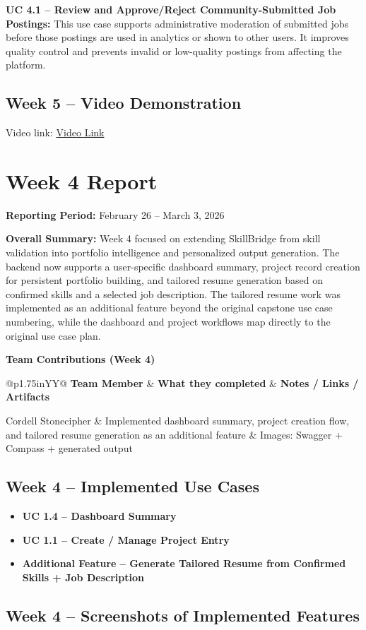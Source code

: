 \documentclass[11pt]{article}
\makeatletter
\newcommand{\WeekReport}[4]{
  \clearpage
  \section*{Week #1 Report}
  \addcontentsline{toc}{section}{Week #1 Report}
  \vspace{-0.25em}
  \noindent\textbf{Reporting Period:} #2

  \vspace{0.5em}
  \noindent\textbf{Overall Summary:} #3

  \vspace{0.75em}
  \noindent\textbf{Team Contributions (Week #1)}
  \vspace{0.25em}

  \begin{table}[H]
    \renewcommand{\arraystretch}{1.2}
    \begin{tabularx}{\linewidth}{@{}p{1.75in}YY@{}}
      \toprule
      \textbf{Team Member} & \textbf{What they completed} & \textbf{Notes / Links / Artifacts} \\
      \midrule
      #4
      \bottomrule
    \end{tabularx}
  \end{table}
}
\makeatother
\begin{document}
\noindent
\textbf{UC 4.1 -- Review and Approve/Reject Community-Submitted Job Postings:}
This use case supports administrative moderation of submitted jobs before those postings are used in analytics or shown to other users. It improves quality control and prevents invalid or low-quality postings from affecting the platform.

\subsection*{Week 5 -- Video Demonstration}
\noindent
Video link: \href{PASTE_PR5_VIDEO_LINK_HERE}{Video Link}

\WeekReport{4}{February 26 -- March 3, 2026}{
Week 4 focused on extending SkillBridge from skill validation into portfolio intelligence and personalized output generation. The backend now supports a user-specific dashboard summary, project record creation for persistent portfolio building, and tailored resume generation based on confirmed skills and a selected job description. The tailored resume work was implemented as an additional feature beyond the original capstone use case numbering, while the dashboard and project workflows map directly to the original use case plan.
}{
Cordell Stonecipher & Implemented dashboard summary, project creation flow, and tailored resume generation as an additional feature & Images: Swagger + Compass + generated output \\
}



\subsection*{Week 4 -- Implemented Use Cases}
\begin{itemize}
  \item \textbf{UC 1.4 -- Dashboard Summary}
  \item \textbf{UC 1.1 -- Create / Manage Project Entry}
  \item \textbf{Additional Feature -- Generate Tailored Resume from Confirmed Skills + Job Description}
\end{itemize}

\subsection*{Week 4 -- Screenshots of Implemented Features}
\end{document}
